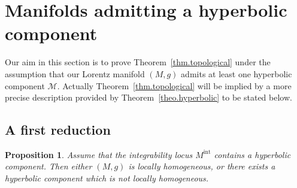 \documentclass[11pt]{article}
\newtheorem{prop}[theo]{Proposition}
\theoremstyle{definition}
\numberwithin{equation}{section}
\numberwithin{figure}{section}
\numberwithin{table}{section}
\newcommand{\mint}{{M^{\intl}}}
\DeclareMathOperator{\intl}{int}
\begin{document}
\section{Manifolds admitting a hyperbolic component}\label{sec.hyperbolic}

Our aim in this section is to prove Theorem~\ref{thm.topological} under the assumption that our Lorentz manifold $(M,g)$ admits at least one hyperbolic component ${\mathcal M}$. Actually Theorem~\ref{thm.topological} will be implied by a more precise description provided by Theorem~\ref{theo.hyperbolic} to be stated below.

\subsection{A first reduction}



\begin{prop}\label{prop.hyperbolic}
Assume that the integrability locus $\mint$ contains a hyperbolic component. Then either $(M,g)$ is locally homogeneous, or there exists a hyperbolic component which is not locally homogeneous.
\end{prop}
\end{document}
